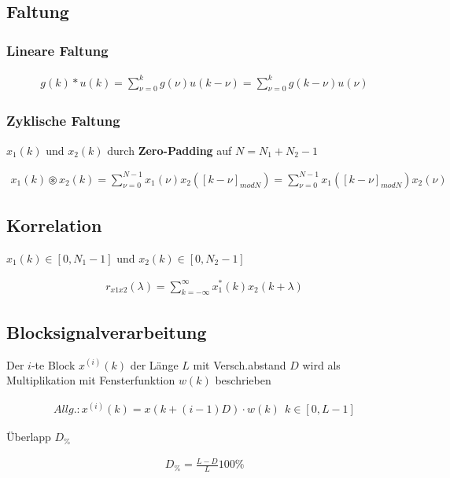 \documentclass[10pt,a4paper]{article}
\begin{document}
  \subsection{Faltung}
  \subsubsection{Lineare Faltung}
  \begin{mdframed}[style=exercise]
    \begin{align}
        g(k)*u(k) = \sum_{\nu =0}^{k} g(\nu) u(k-\nu)= \sum_{\nu =0}^{k} g(k-\nu) u(\nu)
    \end{align}
  \end{mdframed}
  \subsubsection{Zyklische Faltung}
  $x_1(k)$ und $x_2(k)$ durch \textbf{Zero-Padding} auf $N = N_1 +N_2 -1$ 
  \begin{mdframed}[style=exercise]
    \begin{align}
        x_1(k) \circledast x_2(k) = \sum_{\nu =0}^{N-1} x_1(\nu) x_2([k-\nu]_{modN})= \sum_{\nu =0}^{N-1}x_1([k-\nu]_{modN}) x_2(\nu)
    \end{align}
  \end{mdframed}
  \subsection{Korrelation}
  $x_1(k) \in [0,N_1-1]$ und $x_2(k) \in [0,N_2-1]$
  \begin{mdframed}[style=exercise]
    \begin{align}
        r_{x1x2}(\lambda) = \sum_{k=-\infty}^{\infty}x_1^*(k) x_2(k+\lambda) 
    \end{align}
  \end{mdframed}
  \subsection{Blocksignalverarbeitung}
  Der $i$-te Block $x^{(i)}(k)$ der Länge $L$ mit Versch.abstand $D$ 
  wird als Multiplikation mit Fensterfunktion $w(k)$ beschrieben
  \begin{mdframed}[style=exercise]
    \begin{align}
        Allg.:
        x^{(i)}(k) = x(k+(i-1)D) \cdot w(k)\ \ k\in[0,L-1] 
    \end{align}
  \end{mdframed}
  Überlapp $D_\%$
  \begin{mdframed}[style=exercise]
    \begin{align}
        D_\% = \frac{L-D}{L}100\%
    \end{align}
  \end{mdframed}
\end{document}
